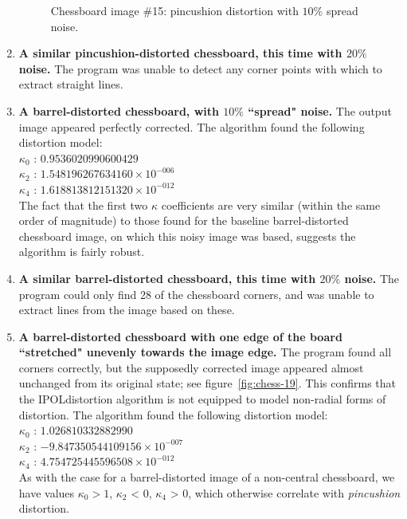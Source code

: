 \begin{enumerate}
\begin{figure}[H]
  \caption{Chessboard image \#15: pincushion distortion with $10\%$ spread noise.}
  \label{fig:chess-15}
\end{figure}
  \item \textbf{A similar pincushion-distorted chessboard, this time with $20\%$ noise.} The program was unable to detect any corner points with which to extract straight lines.
  \item \textbf{A barrel-distorted chessboard, with $10\%$ ``spread" noise.} The output image appeared perfectly corrected. The algorithm found the following distortion model:\\
   $ \kappa_{0}$ : $0.9536020990600429$\\
   $ \kappa_{2}$ : $1.548196267634160 \times 10^{-006}$\\
   $ \kappa_{4}$ : $1.618813812151320 \times 10^{-012}$\\
   The fact that the first two $\kappa$ coefficients are very similar (within the same order of magnitude) to those found for the baseline barrel-distorted chessboard image, on which this noisy image was based, suggests the algorithm is fairly robust.
  \item \textbf{A similar barrel-distorted chessboard, this time with $20\%$ noise.} The program could only find 28 of the chessboard corners, and was unable to extract lines from the image based on these.
  \item \textbf{A barrel-distorted chessboard with one edge of the board ``stretched" unevenly towards the image edge.} The program found all corners correctly, but the supposedly corrected image appeared almost unchanged from its original state; see figure~\ref{fig:chess-19}. This confirms that the IPOLdistortion algorithm is not equipped to model non-radial forms of distortion. The algorithm found the following distortion model:\\
   $ \kappa_{0}$ : $1.026810332882990$\\
   $ \kappa_{2}$ : $-9.847350544109156 \times 10^{-007}$\\
   $ \kappa_{4}$ : $4.754725445596508 \times 10^{-012}$\\
  As with the case for a barrel-distorted image of a non-central chessboard, we have values $\kappa_{0} > 1$, $\kappa_{2}$ < 0, $\kappa_{4}$ > 0, which otherwise correlate with \emph{pincushion} distortion.
\begin{figure}[H]
  \centering

\end{figure}
\end{enumerate}
